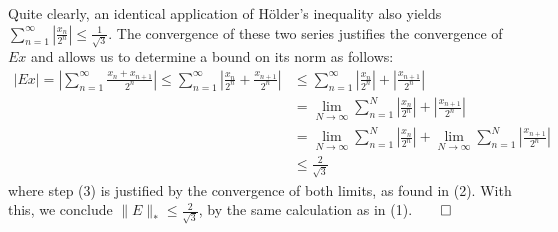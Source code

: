 \documentclass[10pt]{article}
\newcommand{\1}[1]{\mathbbm{1}_{#1}} \newcommand{\mc}[1]{\mathcal{#1}}
\begin{document}
    Quite clearly, an identical application of H\"older's inequality also yields $\sum_{n=1}^\infty|\frac{x_n}{2^n}|\leq\frac{1}{\sqrt{3}}$. The convergence of these two series
    justifies the convergence of $Ex$ and allows us to determine a bound on its norm as follows:
    \begin{align*}
        |Ex|=\left|\sum_{n=1}^\infty\frac{x_{n}+x_{n+1}}{2^n}\right|\leq \sum_{n=1}^\infty\left|\frac{x_n}{2^n}+\frac{x_{n+1}}{2^n}\right|&\leq \sum_{n=1}^\infty\left|\frac{x_{n}}{2^n}\right|+\left|\frac{x_{n+1}}{2^n}\right|\\
        &=\lim_{N\rightarrow\infty}\sum_{n=1}^N\left|\frac{x_{n}}{2^n}\right|+\left|\frac{x_{n+1}}{2^n}\right|\\
        &=\lim_{N\rightarrow\infty}\sum_{n=1}^N\left|\frac{x_{n}}{2^n}\right|+\lim_{N\rightarrow\infty}\sum_{n=1}^N\left|\frac{x_{n+1}}{2^n}\right|\tag{3}\\
        &\leq \frac{2}{\sqrt{3}}
    \end{align*}
    where step (3) is justified by the convergence of both limits, as found in (2). With this, we conclude $\|E\|_\ast\leq \frac{2}{\sqrt{3}}$, by the same calculation as in (1).\hfill{$\qed$}\\[5pt]
\end{document}
